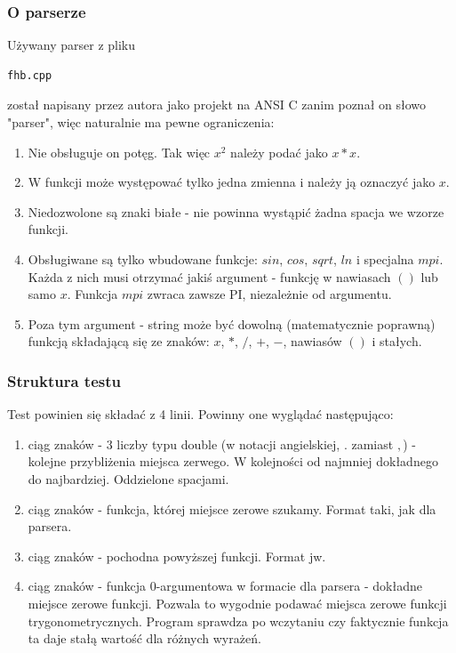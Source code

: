 \documentclass[11pt,wide]{mwart}
\begin{document}
\subsubsection{O parserze}
Używany parser z pliku
\begin{verbatim}fhb.cpp\end{verbatim}
został napisany przez autora jako projekt na ANSI C zanim poznał on słowo "parser", więc naturalnie ma pewne ograniczenia:
\begin{enumerate}
\item
  Nie obsługuje on potęg. Tak więc $x^2$ należy podać jako $x*x$.
\item
  W funkcji może występować tylko jedna zmienna i należy ją oznaczyć jako $x$.
\item
  Niedozwolone są znaki białe - nie powinna wystąpić żadna spacja we wzorze funkcji.
\item
  Obsługiwane są tylko wbudowane funkcje: $sin$, $cos$, $sqrt$, $ln$ i specjalna $mpi$. Każda z nich musi otrzymać jakiś argument - funkcję w nawiasach $( )$ lub samo $x$. Funkcja $mpi$ zwraca zawsze PI, niezależnie od argumentu.
\item
  Poza tym argument - string może być dowolną (matematycznie poprawną) funkcją składającą się ze znaków: $x$, $*$, $/$, $+$, $-$, nawiasów $( )$ i stałych.
\end{enumerate}

\subsubsection{Struktura testu}
Test powinien się składać z 4 linii. Powinny one wyglądać następująco:
\begin{enumerate}
  \item
    ciąg znaków - 3 liczby typu double (w notacji angielskiej, $.$ zamiast $,$) - kolejne przybliżenia miejsca zerwego. W kolejności od najmniej dokładnego do najbardziej. Oddzielone spacjami.
  \item
    ciąg znaków - funkcja, której miejsce zerowe szukamy. Format taki, jak dla parsera.
  \item
    ciąg znaków - pochodna powyższej funkcji. Format jw.
  \item
    ciąg znaków - funkcja 0-argumentowa w formacie dla parsera - dokładne miejsce zerowe funkcji. Pozwala to wygodnie podawać miejsca zerowe funkcji trygonometrycznych. Program sprawdza po wczytaniu czy faktycznie funkcja ta daje stałą wartość dla różnych wyrażeń.
\end{enumerate}
\end{document}
